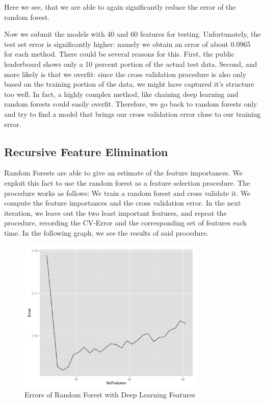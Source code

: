 \documentclass[paper=a4, fontsize=11pt]{scrartcl}
\numberwithin{equation}{section}
\numberwithin{figure}{section}
\numberwithin{table}{section}
\begin{document}
Here we see, that we are able to again significantly reduce the error of the random forest. 

Now we submit the models with 40 and 60 features for testing. Unfortunately, the test set error is significantly higher: namely we obtain an error of about 0.0965 for each method.
There could be several reasons for this. First, the public leaderboard shows only a 10 percent portion of the actual test data. Second, and more likely is that we overfit: since the cross validation procedure is also only based on the training portion of the data, we might have captured it's structure too well. In fact, a highly complex method, like chaining deep learning and random forests could easily overfit. Therefore, we go back to random forests only and try to find a model that brings our cross validation error close to our training error. 

\subsection{Recursive Feature Elimination}

Random Forests are able to give an estimate of the feature importances. We exploit this fact to use the random forest as a feature selection procedure. The procedure works as follows: We train a random forest and cross validate it. 
We compute the feature importances and the cross validation error. In the next iteration, we leave out the two least important features, and repeat the procedure, recording the CV-Error and the corresponding set of features each time. 
In the following graph, we see the results of said procedure.

\begin{figure}[H]
    \centering
    \includegraphics[width=0.8\textwidth]{linechart_results_rfe.png}
    \caption{ Errors of Random Forest with Deep Learning Features }
    \label{fig:errors}
\end{figure}
\end{document}
